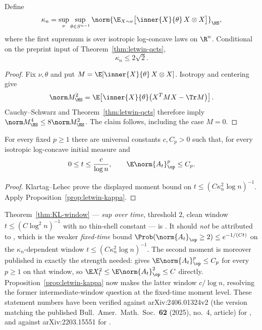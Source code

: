 \documentclass[../../main.tex]{subfiles}
\begin{document}
\begin{proposition}
\label{prop:letwin-kappa}
Define
\[
  \kappa_n
  =\sup_{\nu}\sup_{\theta\in S^{n-1}}
    \norm{\E_{X\sim\nu}\bigl[\inner{X}{\theta}\,X\otimes X\bigr]}_{\HS},
\]
where the first supremum is over isotropic log-concave laws on $\R^n$. Conditional on the
preprint input of Theorem~\ref{thm:letwin-qcts},
\[
  \kappa_n\le2\sqrt2.
\]
\end{proposition}

\begin{proof}
Fix $\nu,\theta$ and put $M=\E[\inner{X}{\theta}\,X\otimes X]$. Isotropy and centering give
\[
  \norm M_{\HS}^2
  =\E\!\left[\inner{X}{\theta}\bigl(X^TMX-\Tr M\bigr)\right].
\]
Cauchy--Schwarz and Theorem~\ref{thm:letwin-qcts} therefore imply
$\norm M_{\HS}^4\le8\norm M_{\HS}^2$. The claim follows, including the case $M=0$.
\end{proof}

\begin{corollary}
\label{cor:letwin-window}
For every fixed $p\ge1$ there are universal constants $c,C_p>0$ such that, for every isotropic
log-concave initial measure and
\[
  0\le t\le \frac{c}{\log n},
  \qquad
  \E\norm{A_t}_{\op}^p\le C_p.
\]
\end{corollary}

\begin{proof}
Klartag--Lehec \cite[Cor.~5.4]{KlartagLehec2022Polylog} prove the displayed moment bound on
$t\le(C\kappa_n^2\log n)^{-1}$. Apply Proposition~\ref{prop:letwin-kappa}.
\end{proof}

\begin{remark}
\label{rem:kl-window-verified}
Theorem~\ref{thm:KL-window} --- \emph{sup over time}, threshold $2$, clean window
$t\le(C\log^2n)^{-1}$ with no thin-shell constant --- is \cite[Thm.~61]{KLnotes}. It should
\emph{not} be attributed to \cite[Lemma~5.2]{KlartagLehec2022Polylog}, which is the weaker
\emph{fixed-time} bound $\Prob(\norm{A_t}_\op\ge2)\le e^{-1/(Ct)}$ on the
$\kappa_n$-dependent window $t\le(C\kappa_n^2\log n)^{-1}$. The second moment is moreover
published in exactly the strength needed:
\cite[Cor.~5.4]{KlartagLehec2022Polylog} gives $\E\norm{A_t}_\op^p\le C_p$ for every $p\ge1$
on that window, so $\E X_t^2\le\E\norm{A_t}_\op^2\le C$ directly. Proposition~\ref{prop:letwin-kappa}
now makes the latter window $c/\log n$, resolving the former intermediate-window question at the
fixed-time moment level. These statement numbers have
been verified against arXiv:2406.01324v2 (the version matching the published
Bull.\ Amer.\ Math.\ Soc.\ \textbf{62} (2025), no.~4, article) for \cite{KLnotes}, and against
arXiv:2203.15551 for \cite{KlartagLehec2022Polylog}.
\end{remark}
\end{document}
